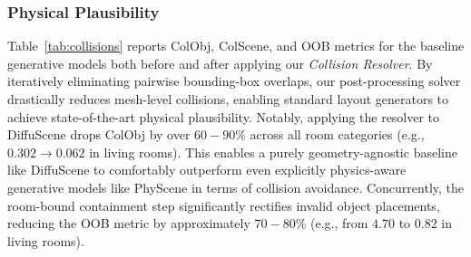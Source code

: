 \subsubsection{Physical Plausibility}
\label{sec:exp:results}

Table~\ref{tab:collisions} reports ColObj, ColScene, and OOB metrics for the baseline generative models both before and after applying our \emph{Collision Resolver}. By iteratively eliminating pairwise bounding-box overlaps, our post-processing solver drastically reduces mesh-level collisions, enabling standard layout generators to achieve state-of-the-art physical plausibility. Notably, applying the resolver to DiffuScene drops ColObj by over $60-90\%$ across all room categories (e.g., $0.302 \rightarrow 0.062$ in living rooms). This enables a purely geometry-agnostic baseline like DiffuScene to comfortably outperform even explicitly physics-aware generative models like PhyScene \cite{yang2024physcenephysicallyinteractable3d} in terms of collision avoidance. Concurrently, the room-bound containment step significantly rectifies invalid object placements, reducing the OOB metric by approximately $70-80\%$ (e.g., from $4.70$ to $0.82$ in living rooms). 


